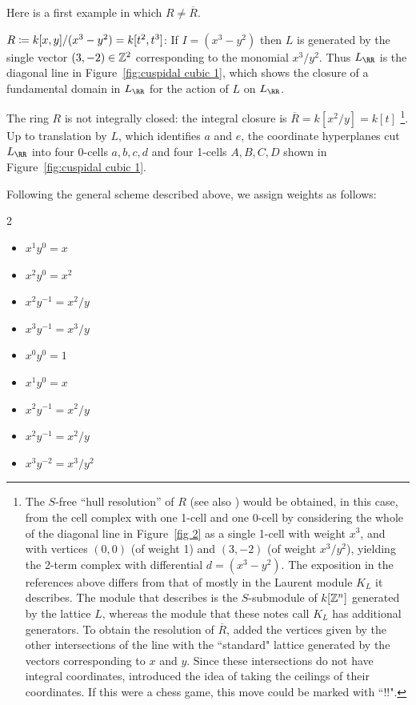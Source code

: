 \documentclass{amsart}
\begin{document}
Here is a first example in which $R \neq \overline R$.

\begin{example} 
  \label{ex:cuspidal-cubic}
  $R\coloneqq k[x,y]/(x^3-y^2) = k[t^{2},t^{3}]$:
If $I = (x^3-y^2)$ then $L$ is generated by the single vector
$ (3,-2) \in \mathbb Z^2$ corresponding to the monomial $x^3/y^2$. Thus
$L_\RR$ is the diagonal line in Figure~\ref{fig:cuspidal cubic 1}, which
shows the closure of a fundamental domain in $L_\RR$ for the action of $L$
on $L_\RR$.

The ring $R$ is not integrally closed: the integral closure is $\overline R = k[x^{2}/y] = k[t]$
\footnote{The $S$-free ``hull resolution'' of $R$ \cite[Section 3]{BS98} (see also \cite[Sections 9.2--9.3]{MillerSturmfels2004}) would be obtained, in this case, from the cell complex with one 1-cell and one 0-cell by considering the whole of the diagonal line in Figure~\ref{fig 2} as a single 1-cell with weight $x^3$, and with vertices
$(0,0)$ (of weight 1) and $(3,-2)$ (of weight $x^3/y^2$), yielding the 2-term complex with differential
$d = (x^3-y^2)$.
The exposition in the references above differs from
that of \cite{BCHS+25} mostly in the Laurent module $K_L$ it describes. The module that \cite{BS98} describes is the $S$-submodule of $k[\mathbb Z^n]$ generated by the lattice $L$, whereas the module that these notes call $K_L$ has additional generators.
To obtain the resolution of $\overline R$, \cite{BCHS+25} added the vertices given by
the other intersections of the line with the ``standard" lattice generated
by the vectors corresponding to $x$ and $y$. Since these intersections do not have integral coordinates, \cite{BCHS+25} introduced the idea of taking the ceilings of
their coordinates. 
If this were a chess game, this move could be marked with ``!!".}.
Up to translation by $L$, which identifies $a$ and $e$, the coordinate hyperplanes cut $L_\RR$ into four 0-cells $a,b,c,d$ and four 1-cells $A,B,C,D$ shown in Figure~\ref{fig:cuspidal cubic 1}.

\goodbreak


Following the general scheme described above, we assign weights as follows:
\begin{multicols}{2}
  \begin{itemize}
  \item[$\psi(A)$:] $x^1y^0 = x$
  \item[$\psi(B)$:] $x^2y^0 = x^2$
  \item[$\psi(C)$:] $x^2y^{-1} = x^2/y$
  \item[$\psi(D)$:] $x^3y^{-1} = x^3/y$
    \smallskip
  \item[$\psi(a)$:] $x^0y^0 = 1$
  \item[$\psi(b)$:] $x^1y^0 = x$
  \item[$\psi(c)$:] $x^2y^{-1} = x^2/y$
  \item[$\psi(d)$:] $x^2y^{-1} = x^2/y$
  \item[$\psi(e)$:] $x^3y^{-2} = x^3/y^{2}$
  \end{itemize}
\end{multicols}


\end{example}
\end{document}
